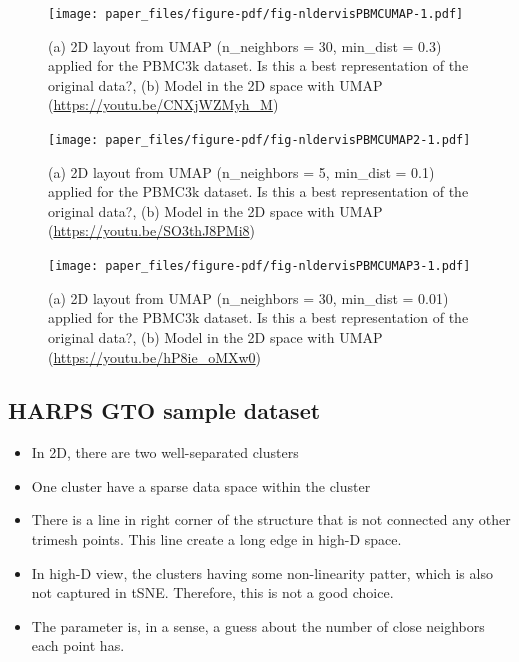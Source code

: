 \documentclass[
  12pt]{article}
\begin{document}
\begin{figure}

{\centering \texttt{[image: paper\_files/figure-pdf/fig-nldervisPBMCUMAP-1.pdf]}

}

\caption{\label{fig-nldervisPBMCUMAP}(a) 2D layout from UMAP
(n\_neighbors = 30, min\_dist = 0.3) applied for the PBMC3k dataset. Is
this a best representation of the original data?, (b) Model in the 2D
space with UMAP (\url{https://youtu.be/CNXjWZMyh_M})}

\end{figure}

\begin{figure}

{\centering \texttt{[image: paper\_files/figure-pdf/fig-nldervisPBMCUMAP2-1.pdf]}

}

\caption{\label{fig-nldervisPBMCUMAP2}(a) 2D layout from UMAP
(n\_neighbors = 5, min\_dist = 0.1) applied for the PBMC3k dataset. Is
this a best representation of the original data?, (b) Model in the 2D
space with UMAP (\url{https://youtu.be/SO3thJ8PMi8})}

\end{figure}

\begin{figure}

{\centering \texttt{[image: paper\_files/figure-pdf/fig-nldervisPBMCUMAP3-1.pdf]}

}

\caption{\label{fig-nldervisPBMCUMAP3}(a) 2D layout from UMAP
(n\_neighbors = 30, min\_dist = 0.01) applied for the PBMC3k dataset. Is
this a best representation of the original data?, (b) Model in the 2D
space with UMAP (\url{https://youtu.be/hP8ie_oMXw0})}

\end{figure}

\hypertarget{harps-gto-sample-dataset}{%
\subsection{HARPS GTO sample dataset}\label{harps-gto-sample-dataset}}

\begin{itemize}
\item
  In 2D, there are two well-separated clusters
\item
  One cluster have a sparse data space within the cluster
\item
  There is a line in right corner of the structure that is not connected
  any other trimesh points. This line create a long edge in high-D
  space.
\item
  In high-D view, the clusters having some non-linearity patter, which
  is also not captured in tSNE. Therefore, this is not a good choice.
\item
  The parameter is, in a sense, a guess about the number of close
  neighbors each point has.
\end{itemize}
\end{document}
